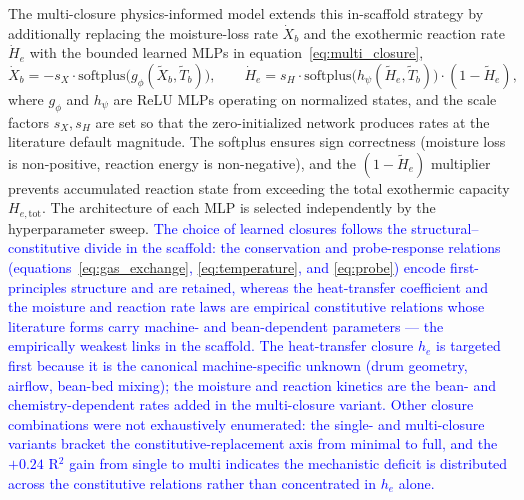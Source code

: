 \documentclass[fleqn,10pt]{wlscirep}
\newcommand{\rev}[1]{\textcolor{blue}{#1}}
\begin{document}
The multi-closure physics-informed model extends this in-scaffold strategy by additionally replacing the moisture-loss rate $\dot{X}_b$ and the exothermic reaction rate $\dot{H}_e$ with the bounded learned MLPs in equation~\eqref{eq:multi_closure},
\begin{equation}\label{eq:multi_closure}
\dot{X}_b = -s_X \cdot \mathrm{softplus}\!\big(g_{\phi}(\tilde{X}_b,\tilde{T}_b)\big),
\qquad
\dot{H}_e = s_H \cdot \mathrm{softplus}\!\big(h_{\psi}(\widetilde{H}_e,\tilde{T}_b)\big) \cdot (1 - \widetilde{H}_e),
\end{equation}
where $g_{\phi}$ and $h_{\psi}$ are ReLU MLPs operating on normalized states, and the scale factors $s_X, s_H$ are set so that the zero-initialized network produces rates at the literature default magnitude. The softplus ensures sign correctness (moisture loss is non-positive, reaction energy is non-negative), and the $(1 - \widetilde{H}_e)$ multiplier prevents accumulated reaction state from exceeding the total exothermic capacity $H_{e,\mathrm{tot}}$. The architecture of each MLP is selected independently by the hyperparameter sweep. \rev{The choice of learned closures follows the structural--constitutive divide in the scaffold: the conservation and probe-response relations (equations~\eqref{eq:gas_exchange}, \eqref{eq:temperature}, and \eqref{eq:probe}) encode first-principles structure and are retained, whereas the heat-transfer coefficient and the moisture and reaction rate laws are empirical constitutive relations whose literature forms carry machine- and bean-dependent parameters --- the empirically weakest links in the scaffold. The heat-transfer closure $h_e$ is targeted first because it is the canonical machine-specific unknown (drum geometry, airflow, bean-bed mixing); the moisture and reaction kinetics are the bean- and chemistry-dependent rates added in the multi-closure variant. Other closure combinations were not exhaustively enumerated: the single- and multi-closure variants bracket the constitutive-replacement axis from minimal to full, and the $+0.24$ R$^2$ gain from single to multi indicates the mechanistic deficit is distributed across the constitutive relations rather than concentrated in $h_e$ alone.}
\end{document}
